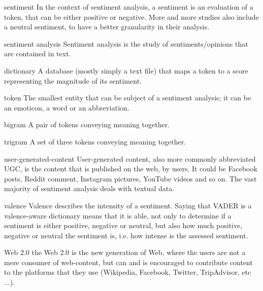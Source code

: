 	\begin{glossy}
		\item[sentiment] In the context of sentiment analysis, a sentiment is an evaluation of a token, that can be either positive or negative. More and more studies also include a neutral sentiment, to have a better granularity in their analysis.
		\item [sentiment analysis] Sentiment analysis is the study of sentiments/opinions that are contained in text.
		\item [dictionary] A database (mostly simply a text file) that maps a token to a score representing the magnitude of its sentiment.
		\item [token] The smallest entity that can be subject of a sentiment analysis; it can be an emoticon, a word or an abbreviation.
		\item [bigram] A pair of tokens conveying meaning together.
		\item [trigram] A set of three tokens conveying meaning together.
		\item [user-generated-content] User-generated content, also more commonly abbreviated UGC, is the content that is published on the web, by users. It could be Facebook posts, Reddit comment, Instagram pictures, YouTube videos and so on. The vast majority of sentiment analysis deals with textual data.
		\item [valence] Valence describes the intensity of a sentiment. Saying that VADER is a valence-aware dictionary means that it is able, not only to determine if a sentiment is either positive, negative or neutral, but also how much positive, negative or neutral the sentiment is, i.e. how intense is the assessed sentiment.
		\item [Web 2.0] the Web 2.0 is the new generation of Web, where the users are not a mere consumer of web-content, but can and is encouraged to contribute content to the platforms that they use (Wikipedia, Facebook, Twitter, TripAdvisor, etc ...).
	\end{glossy}
	